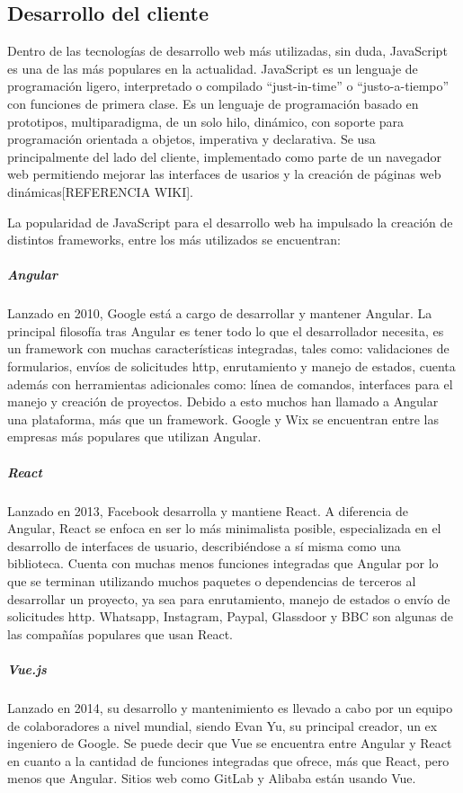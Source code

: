 \subsection{Desarrollo del cliente}
Dentro de las tecnologías de desarrollo web más utilizadas, sin duda, 
JavaScript es una de las más populares en la actualidad. JavaScript es 
un lenguaje de programación ligero, interpretado o compilado ``just-in-time''
o ``justo-a-tiempo'' con funciones de primera clase. Es un lenguaje de programación
basado en prototipos, multiparadigma, de un solo hilo, dinámico, con
soporte para programación orientada a objetos, imperativa y declarativa.
Se usa principalmente del lado del cliente, implementado como parte de un navegador 
web permitiendo mejorar las interfaces de usarios y la creación de
páginas web dinámicas[REFERENCIA WIKI].

La popularidad de JavaScript para el desarrollo web ha impulsado
la creación de distintos frameworks, entre los más 
utilizados se encuentran:

\subparagraph{Angular}
Lanzado en 2010, Google está a cargo de desarrollar y 
mantener Angular. La principal filosofía tras Angular es 
tener todo lo que el desarrollador necesita, es un framework
con muchas características integradas, tales como: validaciones 
de formularios, envíos de solicitudes http, enrutamiento y 
manejo de estados, cuenta además con herramientas adicionales
como: línea de comandos, interfaces para el manejo y 
creación de proyectos. Debido a esto muchos han llamado a Angular
una plataforma, más que un framework. Google y Wix se 
encuentran entre las empresas más populares que utilizan
Angular.

\subparagraph{React}
Lanzado en 2013, Facebook desarrolla y mantiene React.
A diferencia de Angular, React se enfoca en ser lo más minimalista posible,
especializada en el desarrollo de interfaces de usuario, describiéndose
a sí misma como una biblioteca. Cuenta con muchas menos funciones integradas
que Angular por lo que se terminan utilizando muchos paquetes o
dependencias de terceros al desarrollar un proyecto, ya sea para enrutamiento, manejo de estados o
envío de solicitudes http.
Whatsapp, Instagram, Paypal, Glassdoor y BBC son algunas de 
las compañías populares que usan React.

\subparagraph{Vue.js}
Lanzado en 2014, su desarrollo y mantenimiento es llevado a 
cabo por un equipo de colaboradores a nivel mundial, siendo  
Evan Yu, su principal creador, un ex ingeniero de Google.
Se puede decir que Vue se encuentra entre Angular y React en cuanto 
a la cantidad de funciones integradas que ofrece, más que React, pero 
menos que Angular. Sitios web como GitLab y Alibaba están usando Vue. \\

